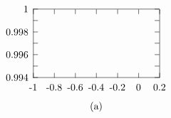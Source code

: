 \documentclass[a4paper,a4paper]{article}
\begin{document}
\begin{figure}[tbh]
\[
\setlength{\unitlength}{0.240900pt} \ifx\plotpoint\undefined%
\newsavebox{\plotpoint}\fi
\begin{picture}(740,450)(0,0)
\font\gnuplot=cmr10 at 10pt
\gnuplot
\sbox{\plotpoint}{\rule[-0.200pt]{0.400pt}{0.400pt}}%
\put(160.0,123.0){\rule[-0.200pt]{4.818pt}{0.400pt}}
\put(140,123){\makebox(0,0)[r]{0.994}}
\put(669.0,123.0){\rule[-0.200pt]{4.818pt}{0.400pt}}
\put(160.0,171.0){\rule[-0.200pt]{4.818pt}{0.400pt}}
\put(669.0,171.0){\rule[-0.200pt]{4.818pt}{0.400pt}}
\put(160.0,219.0){\rule[-0.200pt]{4.818pt}{0.400pt}}
\put(140,219){\makebox(0,0)[r]{0.996}}
\put(669.0,219.0){\rule[-0.200pt]{4.818pt}{0.400pt}}
\put(160.0,267.0){\rule[-0.200pt]{4.818pt}{0.400pt}}
\put(669.0,267.0){\rule[-0.200pt]{4.818pt}{0.400pt}}
\put(160.0,314.0){\rule[-0.200pt]{4.818pt}{0.400pt}}
\put(140,314){\makebox(0,0)[r]{0.998}}
\put(669.0,314.0){\rule[-0.200pt]{4.818pt}{0.400pt}}
\put(160.0,362.0){\rule[-0.200pt]{4.818pt}{0.400pt}}
\put(669.0,362.0){\rule[-0.200pt]{4.818pt}{0.400pt}}
\put(160.0,410.0){\rule[-0.200pt]{4.818pt}{0.400pt}}
\put(140,410){\makebox(0,0)[r]{1}}
\put(669.0,410.0){\rule[-0.200pt]{4.818pt}{0.400pt}}
\put(160.0,123.0){\rule[-0.200pt]{0.400pt}{4.818pt}}
\put(160,82){\makebox(0,0){-1}}
\put(160.0,390.0){\rule[-0.200pt]{0.400pt}{4.818pt}}
\put(248.0,123.0){\rule[-0.200pt]{0.400pt}{4.818pt}}
\put(248,82){\makebox(0,0){-0.8}}
\put(248.0,390.0){\rule[-0.200pt]{0.400pt}{4.818pt}}
\put(336.0,123.0){\rule[-0.200pt]{0.400pt}{4.818pt}}
\put(336,82){\makebox(0,0){-0.6}}
\put(336.0,390.0){\rule[-0.200pt]{0.400pt}{4.818pt}}
\put(424.0,123.0){\rule[-0.200pt]{0.400pt}{4.818pt}}
\put(424,82){\makebox(0,0){-0.4}}
\put(424.0,390.0){\rule[-0.200pt]{0.400pt}{4.818pt}}
\put(513.0,123.0){\rule[-0.200pt]{0.400pt}{4.818pt}}
\put(513,82){\makebox(0,0){-0.2}}
\put(513.0,390.0){\rule[-0.200pt]{0.400pt}{4.818pt}}
\put(601.0,123.0){\rule[-0.200pt]{0.400pt}{4.818pt}}
\put(601,82){\makebox(0,0){0}}
\put(601.0,390.0){\rule[-0.200pt]{0.400pt}{4.818pt}}
\put(689.0,123.0){\rule[-0.200pt]{0.400pt}{4.818pt}}
\put(689,82){\makebox(0,0){0.2}}
\put(689.0,390.0){\rule[-0.200pt]{0.400pt}{4.818pt}}
\put(160.0,123.0){\rule[-0.200pt]{127.436pt}{0.400pt}}
\put(689.0,123.0){\rule[-0.200pt]{0.400pt}{69.138pt}}
\put(160.0,410.0){\rule[-0.200pt]{127.436pt}{0.400pt}}
\put(424,0){\makebox(0,0){(a)}}
\put(160.0,123.0){\rule[-0.200pt]{0.400pt}{69.138pt}}
\put(160,410){\usebox{\plotpoint}}

\end{picture}\]
\end{figure}
\end{document}
